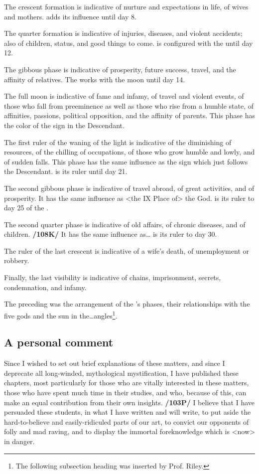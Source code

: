 The crescent formation is indicative of nurture and expectations in life, of wives and mothers. \Mercury\xspace adds its influence until day 8.

The quarter formation is indicative of injuries, diseases, and violent accidents; also of children, status, and good things to come. \Venus\xspace is configured with the \Moon\xspace until day 12.

The gibbous phase is indicative of prosperity, future success, travel, and the affinity of relatives. The \Sun\xspace works with the moon until day 14.

The full moon is indicative of fame and infamy, of travel and violent events, of those who fall from preeminence as well as those who rise from a humble state, of affinities, passions, political opposition, and the affinity of parents. This phase has the color of the sign in the Descendant.

The first ruler of the waning of the light is indicative of the diminishing of resources, of the chilling of occupations, of those who grow humble and lowly, and of sudden falls. This phase has the same influence as the sign which just follows the Descendant. \Mars\xspace is its ruler until day 21.

The second gibbous phase is indicative of travel abroad, of great activities, and of prosperity. It has the same influence as <the IX Place of> the God. \Jupiter\xspace is its ruler to day 25 of the \Moon.

The second quarter phase is indicative of old affairs, of chronic diseases, and of children. \textbf{/108K/} It has
the same influence as\ldots \Saturn\xspace is its ruler to day 30.

The ruler of the last crescent is indicative of a wife’s death, of unemployment or robbery. 

Finally, the last visibility is indicative of chains, imprisonment, secrets, condemnation, and infamy.

The preceding was the arrangement of the \Moon’s phases, their relationships with the five gods and the sun in the\ldots angles\footnote{The following subsection heading was inserted by Prof. Riley.}.

\subsection{\textlangle A personal comment\textrangle}

Since I wished to set out brief explanations of these matters, and since I deprecate all long-winded, mythological mystification, I have published these chapters, most particularly for those who are vitally interested in these matters, those who have spent much time in their studies, and who, because of this, can
make an equal contribution from their own insights. \textbf{/103P/} I believe that I have persuaded these students, in what I have written and will write, to put aside the hard-to-believe and easily-ridiculed parts of our art, to convict our opponents of folly and mad raving, and to display the immortal foreknowledge which is <now> in danger. 

